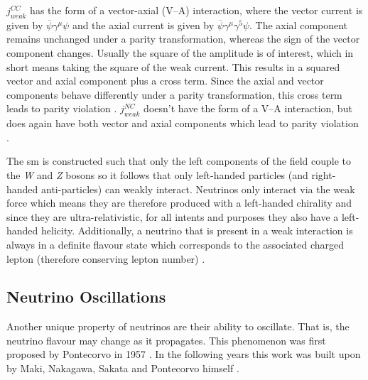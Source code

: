 $j^{CC}_{weak}$ has the form of a vector-axial (V--A) interaction, where the vector current is given by $\overline{\psi}\gamma^\mu\psi$ and the axial current is given by $\overline{\psi}\gamma^\mu\gamma^5\psi$. The axial component remains unchanged under a parity transformation, whereas the sign of the vector component changes. Usually the square of the amplitude is of interest, which in short means taking the square of the weak current. This results in a squared vector and axial component plus a cross term. Since the axial and vector components behave differently under a parity transformation, this cross term leads to parity violation \cite{Particles_and_Fundamental_Interactions:_An_Introduction_to_Particle_Physics} \cite{Fundamentals_of_Neutrino_Physics_and_Astrophysics}. $j^{NC}_{weak}$ doesn't have the form of a V--A interaction, but does again have both vector and axial components which lead to parity violation \cite{Particles_and_Fundamental_Interactions:_An_Introduction_to_Particle_Physics}.

The \gls{sm} is constructed such that only the left components of the field couple to the \textit{W} and \textit{Z} bosons so it follows that only left-handed particles (and right-handed anti-particles) can weakly interact. Neutrinos only interact via the weak force which means they are therefore produced with a left-handed chirality and since they are ultra-relativistic, for all intents and purposes they also have a left-handed helicity. Additionally, a neutrino that is present in a weak interaction is always in a definite flavour state which corresponds to the associated charged lepton (therefore conserving lepton number) \cite{Quarks_and_Leptons:_An_Introductor_Course_in_Modern_Particle_Physics_book}. 

\subsection{Neutrino Oscillations}\label{subsec:Neutrino Oscillations}
Another unique property of neutrinos are their ability to oscillate. That is, the neutrino flavour may change as it propagates. This phenomenon was first proposed by Pontecorvo in 1957 \cite{Pontecorvo}. In the following years this work was built upon by Maki, Nakagawa, Sakata and Pontecorvo himself \cite{MNS_oscillations}. 

